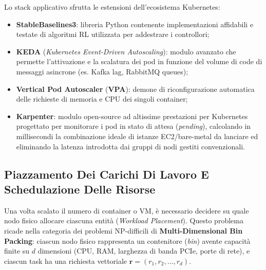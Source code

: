 \documentclass[11pt, a4paper]{article}
\begin{document}
Lo stack applicativo sfrutta le estensioni dell'ecosistema Kubernetes:
\begin{itemize}
    \item \textbf{StableBaselines3}: libreria Python contenente implementazioni affidabili e testate di algoritmi RL utilizzata per addestrare i controllori;
    \item \textbf{KEDA} (\emph{Kubernetes Event-Driven Autoscaling}): modulo avanzato che permette l'attivazione e la scalatura dei pod in funzione del volume di code di messaggi asincrone (es. Kafka lag, RabbitMQ queues);
    \item \textbf{Vertical Pod Autoscaler} (\textbf{VPA}): demone di riconfigurazione automatica delle richieste di memoria e CPU dei singoli container;
    \item \textbf{Karpenter}: modulo open-source ad altissime prestazioni per Kubernetes progettato per monitorare i pod in stato di attesa (\emph{pending}), calcolando in millisecondi la combinazione ideale di istanze EC2/bare-metal da lanciare ed eliminando la latenza introdotta dai gruppi di nodi gestiti convenzionali.
\end{itemize}


\subsection{Piazzamento Dei Carichi Di Lavoro E Schedulazione Delle Risorse}

Una volta scalato il numero di container o VM, è necessario decidere su quale nodo fisico allocare ciascuna entità (\emph{Workload Placement}). Questo problema ricade nella categoria dei problemi NP-difficili di \textbf{Multi-Dimensional Bin Packing}: ciascun nodo fisico rappresenta un contenitore (\emph{bin}) avente capacità finite su $d$ dimensioni (CPU, RAM, larghezza di banda PCIe, porte di rete), e ciascun task ha una richiesta vettoriale $\bm{r} = (r_1, r_2, \dots, r_d)$.
\end{document}
